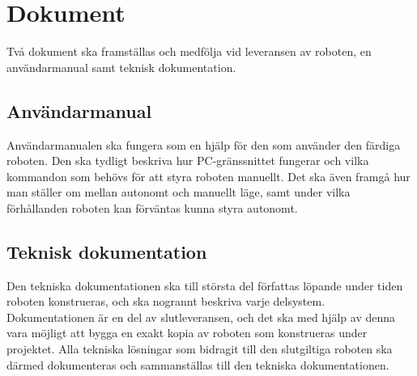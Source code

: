 \section{Dokument}
Två dokument ska framställas och medfölja vid leveransen av roboten, en användarmanual samt teknisk dokumentation.

\subsection{Användarmanual}
Användarmanualen ska fungera som en hjälp för den som använder den färdiga roboten. Den ska tydligt beskriva hur PC-gränssnittet fungerar och vilka kommandon som behövs för att styra roboten manuellt. Det ska även framgå hur man ställer om mellan autonomt och manuellt läge, samt under vilka förhållanden roboten kan förväntas kunna styra autonomt.

\subsection{Teknisk dokumentation}
Den tekniska dokumentationen ska till största del författas löpande under tiden roboten konstrueras, och ska nogrannt beskriva varje delsystem. Dokumentationen är en del av slutleveransen, och det ska med hjälp av denna vara möjligt att bygga en exakt kopia av roboten som konstrueras under projektet. Alla tekniska lösningar som bidragit till den slutgiltiga roboten ska därmed dokumenteras och sammanställas till den tekniska dokumentationen.
